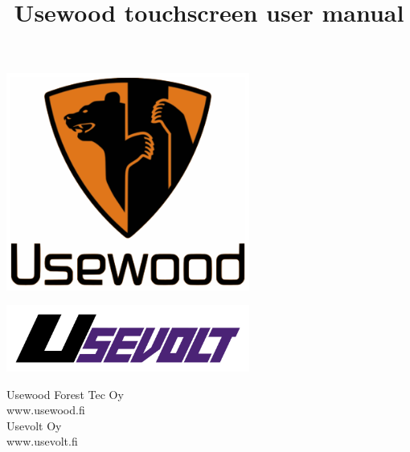 \documentclass[12pt,a4paper,english]{uvmanual}
\title{Usewood touchscreen user manual}
\begin{document}
%	
\thispagestyle{empty}
\vspace*{-1cm}\noindent
\begin{center}
\includegraphics[width=8cm]{img/uw_logo_color.png}   %
\end{center}
\vspace{1cm}
\begin{center}
\includegraphics[width=8cm]{img/Usevolt.png}   %
\end{center}



\vspace{2.8cm}
\maketitle
\vspace{2.8cm}


\begin{minipage}[c]{8.8cm}
  \begin{spacing}{1.0}
    \textsf{Usewood Forest Tec Oy}\\
    \textsf{www.usewood.fi}\\
    \textsf{Usevolt Oy}\\
    \textsf{www.usevolt.fi}\\
  \end{spacing}
\end{minipage}
\end{document}
